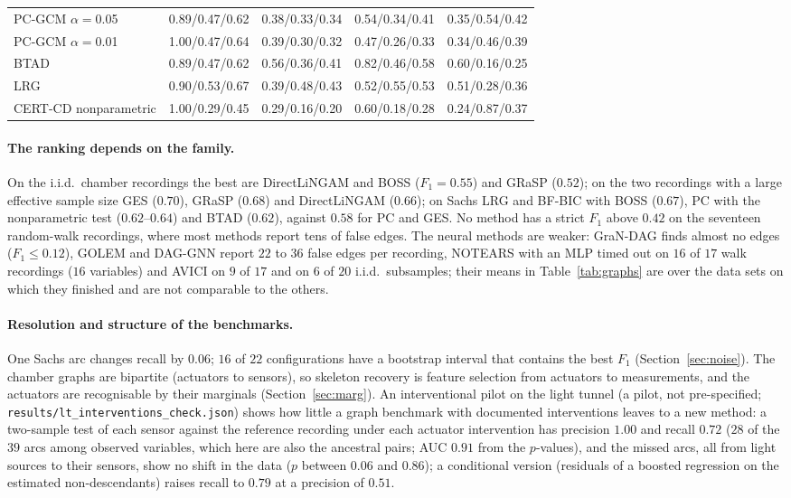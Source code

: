 \begin{table}[t]
\begin{tabular}{@{}lcccc@{}}
PC-GCM $\alpha=$0.05 & 0.89/0.47/0.62 & 0.38/0.33/0.34 & 0.54/0.34/0.41 & 0.35/0.54/0.42\\
PC-GCM $\alpha=$0.01 & 1.00/0.47/0.64 & 0.39/0.30/0.32 & 0.47/0.26/0.33 & 0.34/0.46/0.39\\
BTAD & 0.89/0.47/0.62 & 0.56/0.36/0.41 & 0.82/0.46/0.58 & 0.60/0.16/0.25\\
LRG & 0.90/0.53/0.67 & 0.39/0.48/0.43 & 0.52/0.55/0.53 & 0.51/0.28/0.36\\
CERT-CD nonparametric & 1.00/0.29/0.45 & 0.29/0.16/0.20 & 0.60/0.18/0.28 & 0.24/0.87/0.37\\
\bottomrule
\end{tabular}
\end{table}

\paragraph{The ranking depends on the family.} On the i.i.d.\ chamber recordings the best are DirectLiNGAM and BOSS ($F_1=0.55$) and GRaSP ($0.52$); on the two recordings with a large effective sample size GES ($0.70$), GRaSP ($0.68$) and DirectLiNGAM ($0.66$); on Sachs LRG and BF-BIC with BOSS ($0.67$), PC with the nonparametric test ($0.62$--$0.64$) and BTAD ($0.62$), against $0.58$ for PC and GES. No method has a strict $F_1$ above $0.42$ on the seventeen random-walk recordings, where most methods report tens of false edges. The neural methods are weaker: GraN-DAG finds almost no edges ($F_1\le0.12$), GOLEM and DAG-GNN report $22$ to $36$ false edges per recording, NOTEARS with an MLP timed out on $16$ of $17$ walk recordings ($16$ variables) and AVICI on $9$ of $17$ and on $6$ of $20$ i.i.d.\ subsamples; their means in Table~\ref{tab:graphs} are over the data sets on which they finished and are not comparable to the others.

\paragraph{Resolution and structure of the benchmarks.} One Sachs arc changes recall by $0.06$; $16$ of $22$ configurations have a bootstrap interval that contains the best $F_1$ (Section~\ref{sec:noise}). The chamber graphs are bipartite (actuators to sensors), so skeleton recovery is feature selection from actuators to measurements, and the actuators are recognisable by their marginals (Section~\ref{sec:marg}). An interventional pilot on the light tunnel (a pilot, not pre-specified; \texttt{results/lt\_interventions\_check.json}) shows how little a graph benchmark with documented interventions leaves to a new method: a two-sample test of each sensor against the reference recording under each actuator intervention has precision $1.00$ and recall $0.72$ ($28$ of the $39$ arcs among observed variables, which here are also the ancestral pairs; AUC $0.91$ from the $p$-values), and the missed arcs, all from light sources to their sensors, show no shift in the data ($p$ between $0.06$ and $0.86$); a conditional version (residuals of a boosted regression on the estimated non-descendants) raises recall to $0.79$ at a precision of $0.51$.

